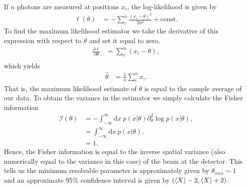 If $n$ photons are measured at positions $x_i$, the log-likelihood is given by
\begin{align}
  \ell(\theta) &= -\sum_i^n \frac{(x_i - \theta)^2}{2\sigma^2} + \text{const}.
\end{align}
To find the maximum likelihood estimator we take the derivative of this expression with respect to $\theta$ and set it equal to zero,
\begin{align}
\nonumber  \frac{\partial \ell}{\partial \theta} &= \sum_i^n (x_i - \theta), \\
\end{align}
which yields
\begin{align}
  \hat{\theta} &= \frac{1}{n}\sum_i^n x_i.
\end{align}
That is, the maximum likelihood estimate of $\theta$ is equal to the sample average of our data.  To obtain the variance in the estimator we simply calculate the Fisher information
\begin{align}
\nonumber  \mathcal{I}(\theta) &= -\int_{-\infty}^{\infty}\text{d}x~ p(x|\theta) \partial_\theta^2  \log p(x|\theta), \\
\nonumber                      &= \int_{-\infty}^{\infty}\text{d}x~ p(x|\theta), \\
                               &= 1.
\end{align}
Hence, the Fisher information is equal to the inverse spatial variance (also numerically equal to the variance in this case) of the beam at the detector.  This tells us the minimum resolvable parameter is approximately given by $\theta_{min} \sim 1$ and an approximate 95\% confidence interval is given by $(\left\langle X \right\rangle - 2, \left\langle X \right\rangle + 2)$.



